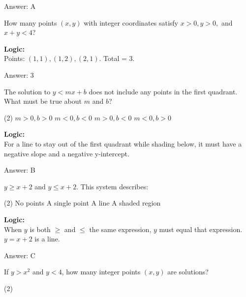 \documentclass[11pt,paper=a4,answers]{exam}
\begin{document}
\begin{questions}
\begin{solution}
\vspace{15pt}
Answer: \colorbox{yellow!100}{A}
\end{solution}

\question
How many points $(x, y)$ with integer coordinates satisfy $x > 0, y > 0,$ and $x + y < 4$?

\begin{solution}
\textbf{Logic:} \\
Points: $(1, 1), (1, 2), (2, 1)$. Total = 3.

\vspace{15pt}
Answer: \colorbox{yellow!100}{3}
\end{solution}

\question
The solution to $y < mx + b$ does not include any points in the first quadrant. What must be true about $m$ and $b$?
\begin{tasks}(2)
    \task $m > 0, b > 0$
    \task $m < 0, b < 0$
    \task $m > 0, b < 0$
    \task $m < 0, b > 0$
\end{tasks}

\begin{solution}
\textbf{Logic:} \\
For a line to stay out of the first quadrant while shading below, it must have a negative slope and a negative y-intercept.

\vspace{15pt}
Answer: \colorbox{yellow!100}{B}
\end{solution}

\question
$y \ge x + 2$ and $y \le x + 2$. This system describes:
\begin{tasks}(2)
    \task No points
    \task A single point
    \task A line
    \task A shaded region
\end{tasks}

\begin{solution}
\textbf{Logic:} \\
When $y$ is both $\ge$ and $\le$ the same expression, $y$ must equal that expression. $y = x + 2$ is a line.

\vspace{15pt}
Answer: \colorbox{yellow!100}{C}
\end{solution}

\question
If $y > x^2$ and $y < 4$, how many integer points $(x, y)$ are solutions?
\begin{tasks}(2)
\end{tasks}


\end{questions}
\end{document}
